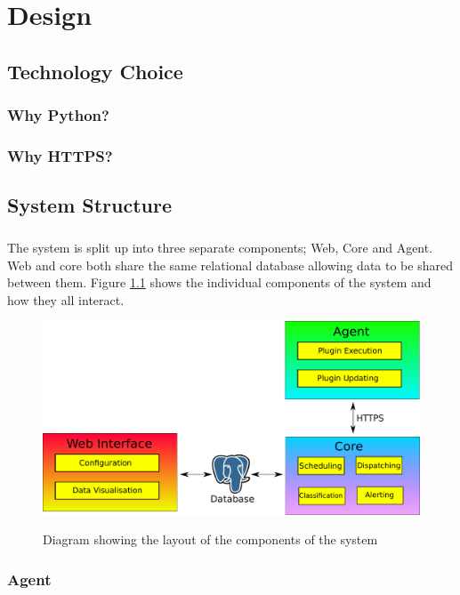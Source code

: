 \documentclass[bsc,logo,twoside]{infthesis}
\begin{document}
\chapter{Design}
\section{Technology Choice}
\subsection{Why Python?}
\subsection{Why HTTPS?}

\section{System Structure}
\paragraph*{}
	The system is split up into three separate components; Web, Core and Agent. Web
	and core both share the same relational database allowing data to be shared
	between them.  Figure \ref{system_structure} shows the individual components of
	the system and how they all interact.

\begin{figure}[H]
	\caption{Diagram showing the layout of the components of the system}
	\includegraphics[scale=0.5]{assets/system_structure.pdf}
	\label{system_structure}
\end{figure}

\subsection{Agent}
\end{document}
